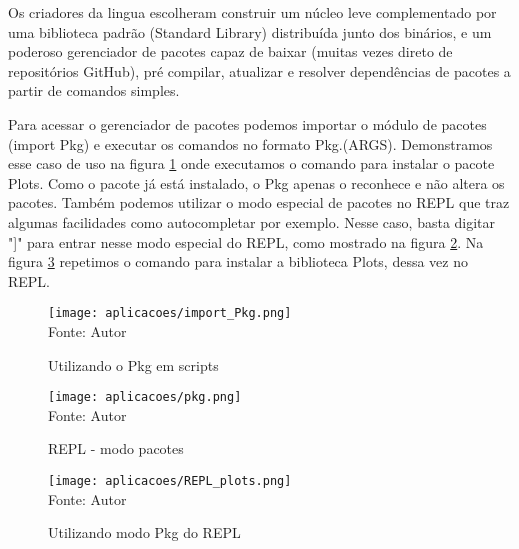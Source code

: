 Os criadores da lingua escolheram construir um núcleo leve complementado por uma biblioteca padrão (Standard Library) distribuída junto dos binários, e um poderoso gerenciador de pacotes capaz de baixar (muitas vezes direto de repositórios GitHub), pré compilar, atualizar e resolver dependências de pacotes a partir de comandos simples. 

Para acessar o gerenciador de pacotes podemos importar o módulo de pacotes (import Pkg) e executar os comandos no formato Pkg.(ARGS). Demonstramos esse caso de uso na figura \ref{import_Pkg} onde executamos o comando para instalar o pacote Plots. Como o pacote já está instalado, o Pkg apenas o reconhece e não altera os pacotes.
Também podemos utilizar o modo especial de pacotes no REPL que traz algumas facilidades como autocompletar por exemplo. Nesse caso, basta digitar "]" para entrar nesse modo especial do REPL, como mostrado na figura \ref{pkg}. Na figura \ref{REPL_plots} repetimos o comando para instalar a biblioteca Plots, dessa vez no REPL. 
\begin{figure}[H]
\begin{center}
    \caption{Utilizando o Pkg em scripts} \label{import_Pkg}
    \texttt{[image: aplicacoes/import\_Pkg.png]} \\
    {\tiny \sf Fonte: Autor}
\end{center}
\end{figure} 

\begin{figure}[H]
\begin{center}
    \caption{REPL - modo pacotes} \label{pkg}
    \texttt{[image: aplicacoes/pkg.png]} \\
    {\tiny \sf Fonte: Autor}
\end{center}
\end{figure} 

\begin{figure}[H]
\begin{center}
    \caption{Utilizando modo Pkg do REPL } \label{REPL_plots}
    \texttt{[image: aplicacoes/REPL\_plots.png]} \\
    {\tiny \sf Fonte: Autor}
\end{center}
\end{figure}

